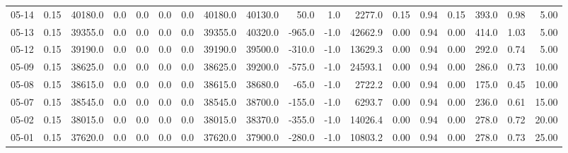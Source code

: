 \begin{threeparttable}
{\begin{tabular}{lrrrrrrrrrrrrrrrrr}
  05-14 &     0.15 & 40180.0 &               0.0 &               0.0 &                0.0 &                0.0 & 40180.0 & 40130.0 &       50.0 &                      1.0 &              2277.0 &       0.15 &      0.94 &           0.15 &            393.0 &            0.98 &                   5.00 \\
  05-13 &     0.15 & 39355.0 &               0.0 &               0.0 &                0.0 &                0.0 & 39355.0 & 40320.0 &     -965.0 &                     -1.0 &             42662.9 &       0.00 &      0.94 &           0.00 &            414.0 &            1.03 &                   5.00 \\
  05-12 &     0.15 & 39190.0 &               0.0 &               0.0 &                0.0 &                0.0 & 39190.0 & 39500.0 &     -310.0 &                     -1.0 &             13629.3 &       0.00 &      0.94 &           0.00 &            292.0 &            0.74 &                   5.00 \\
  05-09 &     0.15 & 38625.0 &               0.0 &               0.0 &                0.0 &                0.0 & 38625.0 & 39200.0 &     -575.0 &                     -1.0 &             24593.1 &       0.00 &      0.94 &           0.00 &            286.0 &            0.73 &                  10.00 \\
  05-08 &     0.15 & 38615.0 &               0.0 &               0.0 &                0.0 &                0.0 & 38615.0 & 38680.0 &      -65.0 &                     -1.0 &              2722.2 &       0.00 &      0.94 &           0.00 &            175.0 &            0.45 &                  10.00 \\
  05-07 &     0.15 & 38545.0 &               0.0 &               0.0 &                0.0 &                0.0 & 38545.0 & 38700.0 &     -155.0 &                     -1.0 &              6293.7 &       0.00 &      0.94 &           0.00 &            236.0 &            0.61 &                  15.00 \\
  05-02 &     0.15 & 38015.0 &               0.0 &               0.0 &                0.0 &                0.0 & 38015.0 & 38370.0 &     -355.0 &                     -1.0 &             14026.4 &       0.00 &      0.94 &           0.00 &            278.0 &            0.72 &                  20.00 \\
  05-01 &     0.15 & 37620.0 &               0.0 &               0.0 &                0.0 &                0.0 & 37620.0 & 37900.0 &     -280.0 &                     -1.0 &             10803.2 &       0.00 &      0.94 &           0.00 &            278.0 &            0.73 &                  25.00 \\

\end{tabular}}
\end{threeparttable}

